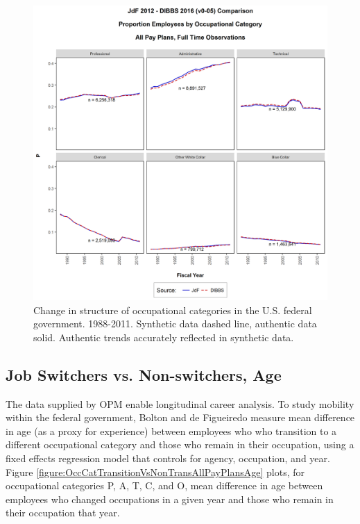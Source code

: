 \documentclass[10pt, letterpaper]{article}
\begin{document}
\begin{spacing}{1.0}
\begin{figure}[h]
    \centering
    \includegraphics[width=6.5in, trim={0 0.6in 0 1in}, clip]{OccCatVsFYAllPayPlans.png}
    \caption{Change in structure of occupational categories in the U.S. federal government.  1988-2011.  Synthetic data dashed line, authentic data solid.  Authentic trends accurately reflected in synthetic data.}
    \label{figure:OccCatVsFYAllPayPlans}
\end{figure}

\clearpage

\subsection{Job Switchers vs. Non-switchers, Age}

The data supplied by OPM enable longitudinal career analysis.  To study mobility within the federal government, Bolton and de Figueiredo measure mean difference in age (as a proxy for experience) between employees who who transition to a different occupational category and those who remain in their occupation, using a fixed effects regression model that controls for agency, occupation, and year.  Figure \ref{figure:OccCatTransitionVsNonTransAllPayPlansAge} plots, for occupational categories P, A, T, C, and O, mean difference in age between employees who changed occupations in a given year and those who remain in their occupation that year.\\


\end{spacing}
\end{document}
